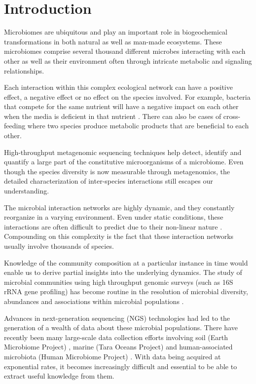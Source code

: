 
\section*{Introduction}

  Microbiomes are ubiquitous and play an important role in biogeochemical transformations in both natural as well as man-made ecosystems.
  These microbiomes comprise several thousand different microbes interacting with each other as well as their environment often through intricate metabolic and signaling relationships.

  Each interaction within this complex ecological network can have a positive effect, a negative effect or no effect on the species involved. 
  For example, bacteria that compete for the same nutrient will have a negative impact on each other when the media is deficient in that nutrient \cite{Ghoul2016}.
  There can also be cases of cross-feeding where two species produce metabolic products that are beneficial to each other.

  High-throughput metagenomic sequencing techniques help detect, identify and quantify a large part of the constitutive microorganisms of a microbiome.
  Even though the species diversity is now measurable through metagenomics, the detailed characterization of inter-species interactions still escapes our understanding.

  The microbial interaction networks are highly dynamic, and they constantly reorganize in a varying environment.
  Even under static conditions, these interactions are often difficult to predict due to their non-linear nature \cite{Konopka2015}.
  Compounding on this complexity is the fact that these interaction networks usually involve thousands of species.

  Knowledge of the community composition at a particular instance in time would enable us to derive partial insights into the underlying dynamics.
  The study of microbial communities using high throughput genomic surveys (such as 16S rRNA gene profiling) has become routine in the resolution of microbial diversity, abundances and associations within microbial populations \cite{Jovel2016}.

  Advances in next-generation sequencing (NGS) technologies had led to the generation of a wealth of data about these microbial populations.
  There have recently been many large-scale data collection efforts involving soil (Earth Microbiome Project)  \cite{Thompson2017}, marine (Tara Oceans Project) \cite{Zhang2015} and human-associated microbiota (Human Microbiome Project) \cite{HumanMicrobiomeProjectConsortium2012}.
  With data being acquired at exponential rates, it becomes increasingly difficult and essential to be able to extract useful knowledge from them.

